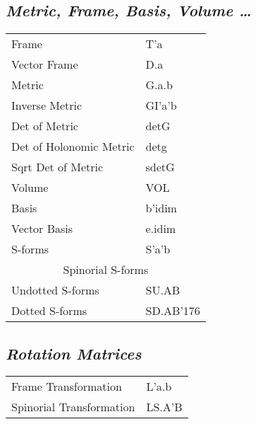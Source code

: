 \documentclass[twocolumn]{article}
\newcommand{\grgtt}{\ttfamily}
\renewcommand{\tt}{\grgtt}
\newcommand{\cc}{{\tt \char'176}}           %
\begin{document}
\subsection{\sf\slshape  Metric, Frame, Basis, Volume \dots}
\begin{tabular}{|l|l|}\hline
\tt    Frame                   &\tt   T'a\\
\tt    Vector Frame            &\tt   D.a\\
\hline
\tt    Metric                  &\tt   G.a.b\\
\tt    Inverse Metric          &\tt   GI'a'b\\
\tt    Det of Metric           &\tt   detG\\
\tt    Det of Holonomic Metric &\tt   detg\\
\tt    Sqrt Det of Metric      &\tt   sdetG\\
\hline
\tt    Volume                  &\tt   VOL\\
\hline
\tt    Basis                   &\tt   b'idim \\
\tt    Vector Basis            &\tt   e.idim \\
\hline
\tt    S-forms                 &\tt   S'a'b\\
\hline
\multicolumn{2}{|c|}{\tt Spinorial S-forms} \\
\tt    Undotted S-forms   &\tt    SU.AB\\
\tt    Dotted S-forms     &\tt    SD.AB\cc\\
\hline\end{tabular}

\subsection{\sf\slshape  Rotation Matrices}
\begin{tabular}{|l|l|}\hline
\tt    Frame Transformation      &\tt   L'a.b \\
\tt    Spinorial Transformation  &\tt   LS.A'B \\
\hline\end{tabular}
\end{document}
